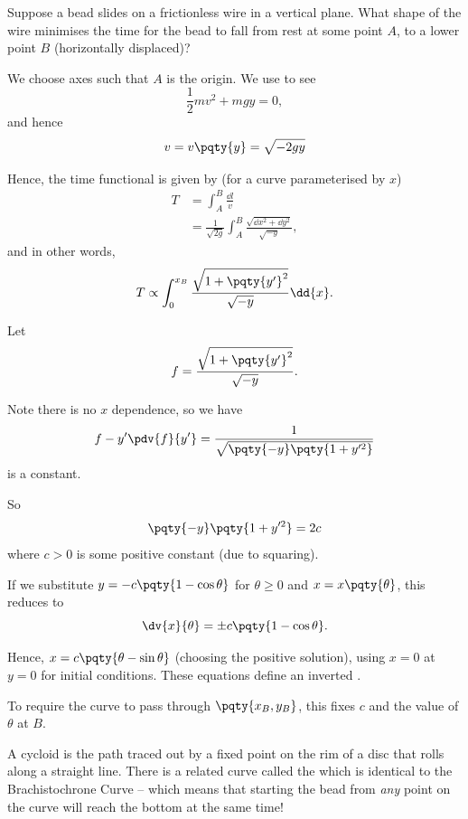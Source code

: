 \begin{example}
    \label{ex:brachistochrone-curve}%
    Suppose a bead slides on a frictionless wire in a vertical plane. What shape of the wire minimises the time for the bead to fall from rest at some point \(A\), to a lower point \(B\) (horizontally displaced)?
    
    We choose axes such that \(A\) is the origin. We use  to see
    \[
        \frac{1}{2} m v^2 + m g y = 0,
    \]
    and hence
    \[
        v = v \pqty{y} = \sqrt{- 2 g y}
    \]

    Hence, the time functional is given by (for a curve parameterised by \(x\))
    \begin{align*}
        T &= \int_{A}^{B} \frac{\dd{l}}{v} \\
        &= \frac{1}{\sqrt{2g}} \int_{A}^{B} \frac{\sqrt{\dd{x}^2 + \dd{y}^2}}{\sqrt{-y}},
    \end{align*}
    and in other words,
    \[
        T \propto \int_{0}^{x_B} \frac{\sqrt{1 + \pqty{y'}^2}}{\sqrt{-y}} \dd{x}.
    \]

    Let
    \[
        f = \frac{\sqrt{1 + \pqty{y'}^2}}{\sqrt{-y}}.
    \]

    Note there is no \(x\) dependence, so we have
    \[
        f - y' \pdv{f}{y'} = \frac{1}{\sqrt{\pqty{-y} \pqty{1 + y'^2}}}
    \]
    is a constant.

    So
    \[
        \pqty{-y} \pqty{1 + y'^2} = 2c
    \]
    where \(c > 0\) is some positive constant (due to squaring).

    If we substitute \(y = -c \pqty{1 - \cos \theta}\) for \(\theta \geq 0\) and \(x = x \pqty{\theta}\), this reduces to
    \[
        \dv{x}{\theta} = \pm c \pqty{1 - \cos \theta}.
    \]
    
    Hence, \(x = c \pqty{\theta - \sin \theta}\) (choosing the positive solution), using \(x = 0\) at \(y = 0\) for initial conditions. These equations define an inverted .

    To require the curve to pass through \(\pqty{x_B, y_B}\), this fixes \(c\) and the value of \(\theta\) at \(B\).
\end{example}

A cycloid is the path traced out by a fixed point on the rim of a disc that rolls along a straight line. There is a related curve called the  which is identical to the Brachistochrone Curve -- which means that starting the bead from \emph{any} point on the curve will reach the bottom at the same time!